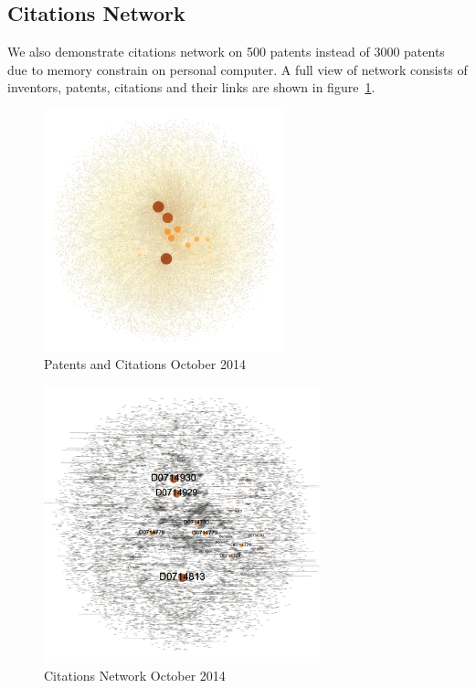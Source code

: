\documentclass{article}
\begin{document}
\subsection{Citations Network}

We also demonstrate citations network on 500 patents instead of 3000 patents due to memory constrain on personal computer. A full view of network consists of inventors, patents, citations and their links are shown in figure~\ref{fig:citation}. 
\begin{figure}[H]
\centering
\includegraphics[width=70mm]{citation.png}
\caption{ Patents and Citations October 2014 }\label{fig:citation}
\end{figure}

\begin{figure}[H]
\centering
\includegraphics[width=80mm]{citation-label.png}
\caption{ Citations Network October 2014 }\label{fig:citationlabel}
\end{figure}
\end{document}
